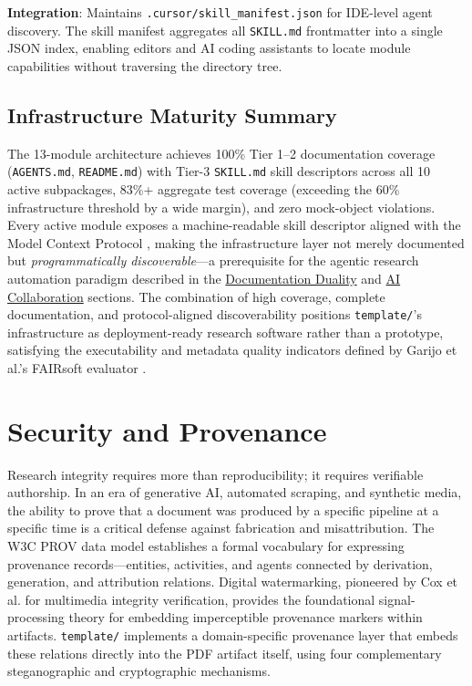 \documentclass[
]{article}
\begin{document}
\textbf{Integration}: Maintains \texttt{.cursor/skill\_manifest.json}
for IDE-level agent discovery. The skill manifest aggregates all
\texttt{SKILL.md} frontmatter into a single JSON index, enabling editors
and AI coding assistants to locate module capabilities without
traversing the directory tree.

\subsection{Infrastructure Maturity
Summary}\label{infrastructure-maturity-summary}

The 13-module architecture achieves 100\% Tier 1--2 documentation
coverage (\texttt{AGENTS.md}, \texttt{README.md}) with Tier-3
\texttt{SKILL.md} skill descriptors across all 10 active subpackages,
83\%+ aggregate test coverage (exceeding the 60\% infrastructure
threshold by a wide margin), and zero mock-object violations. Every
active module exposes a machine-readable skill descriptor aligned with
the Model Context Protocol \citep{anthropic2024mcp}, making the
infrastructure layer not merely documented but \emph{programmatically
discoverable}---a prerequisite for the agentic research automation
paradigm described in the
\href{03c_documentation.md\#documentation-duality-and-ai-collaboration}{Documentation
Duality} and
\href{05d_ai_collaboration.md\#the-ai-collaboration-model}{AI
Collaboration} sections. The combination of high coverage, complete
documentation, and protocol-aligned discoverability positions
\texttt{template/}'s infrastructure as deployment-ready research
software rather than a prototype, satisfying the executability and
metadata quality indicators defined by Garijo et al.'s FAIRsoft
evaluator \citep{garijo2024fairsoft}.

\newpage

\section{Security and Provenance}\label{security-and-provenance}

Research integrity requires more than reproducibility; it requires
verifiable authorship. In an era of generative AI, automated scraping,
and synthetic media, the ability to prove that a document was produced
by a specific pipeline at a specific time is a critical defense against
fabrication and misattribution. The W3C PROV data model
\citep{moreau2013provdm} establishes a formal vocabulary for expressing
provenance records---entities, activities, and agents connected by
derivation, generation, and attribution relations. Digital watermarking,
pioneered by Cox et al. \citep{cox1997secure} for multimedia integrity
verification, provides the foundational signal-processing theory for
embedding imperceptible provenance markers within artifacts.
\texttt{template/} implements a domain-specific provenance layer that
embeds these relations directly into the PDF artifact itself, using four
complementary steganographic and cryptographic mechanisms.
\end{document}
